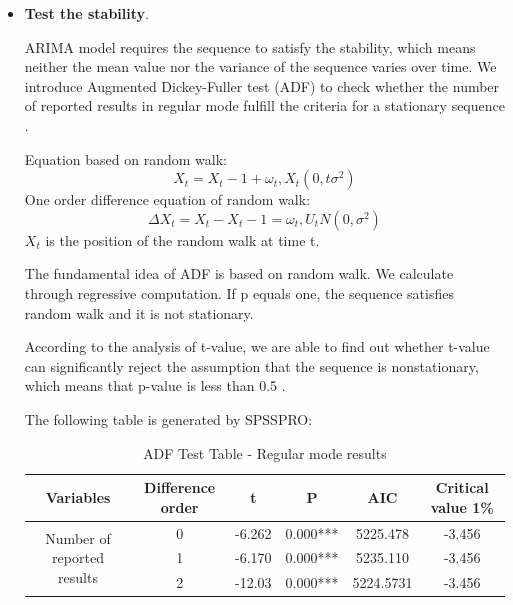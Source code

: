 \documentclass{mcmthesis}
\begin{document}
\begin{itemize}
    \item {\bf Test the stability}. 
    
    ARIMA model requires the sequence to satisfy the stability, which means neither the mean value nor the variance of the sequence varies over time. We introduce Augmented Dickey-Fuller test (ADF) to check whether the number of reported results in regular mode fulfill the criteria for a stationary sequence \cite{3}.
    
    Equation based on random walk:
    \begin{equation} \label{eq1}
        X_t = X_t-1 + \omega_t, X_t(0,t{\sigma}^{2})
        \end{equation}
    One order difference equation of random walk: 
    \begin{equation} \label{eq2}
        \Delta X_t = X_t - X_t-1 = \omega_t ,U_tN(0,{\sigma}^{2} )
    \end{equation} 
    $X_t$ is the position of the random walk at time t.

    The fundamental idea of ADF is based on random walk. We calculate  through regressive computation. If p equals one, the sequence satisfies random walk and it is not stationary.
    
    According to the analysis of t-value, we are able to find out whether t-value can significantly reject the assumption that the sequence is nonstationary, which means that p-value is less than 0.5 .

    The following table is generated by SPSSPRO:
    \begin{table}[H]  %
    \centering        %
    \caption{ADF Test Table - Regular mode results}  %
    \vspace{0.15cm}
    \renewcommand\arraystretch{1.2}
    \label{tab1}                       %
    \begin{tabular}{|c|c|c|c|c|c|}  %
    \hline                    %
    Variables & Difference order & t & P & AIC & Critical value 1\%   \\ \hline  %
    \multirow{3}{*}{Number of reported results} & 0 & -6.262 & 0.000*** & 5225.478 & -3.456\\ 
    & 1 & -6.170 & 0.000*** & 5235.110 & -3.456\\ 
    & 2 & -12.03 & 0.000*** & 5224.5731 & -3.456\\ \hline 
    \end{tabular}
    \end{table}
    

\end{itemize}
\end{document}
